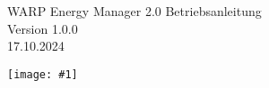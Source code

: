 \documentclass[a4paper,10pt]{article}
\title{}
\author{}
\newcommand{\gfx}[1]{\texttt{[image: \#1]}}
\begin{document}
\pagestyle{empty}
\begin{titlepage}
	\vspace*{-3.08cm}
	\colorbox{boxgray}{}
	\vfill
	\begin{center}
		\Huge
        \color{white}
		WARP Energy Manager 2.0 Betriebsanleitung\\\vspace{1cm}
		\large
		Version 1.0.0\\\vspace{0.25cm}
		17.10.2024
	\end{center}
	\vfill \gfx{./img/resized/warp-energy-manager.png}
   	\pagecolor{covergray}

\end{titlepage}
\newpage
\pagecolor{white}
\null
\newpage
\pagestyle{fancy}
\end{document}
